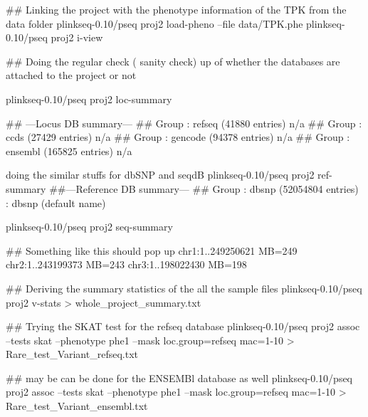## Linking the project with the phenotype information of the TPK from the data folder
plinkseq-0.10/pseq proj2 load-pheno --file data/TPK.phe 
plinkseq-0.10/pseq proj2 i-view


## Doing the regular check ( sanity check) up of whether the databases are attached to the project or not

plinkseq-0.10/pseq proj2 loc-summary

## ---Locus DB summary---
## Group : refseq (41880 entries) n/a
## Group : ccds (27429 entries) n/a
## Group : gencode (94378 entries) n/a
## Group : ensembl (165825 entries) n/a

doing the similar stuffs for dbSNP and seqdB
plinkseq-0.10/pseq proj2 ref-summary 
##---Reference DB summary---
## Group : dbsnp (52054804 entries) : dbsnp (default name)

plinkseq-0.10/pseq proj2 seq-summary 

## Something like this should pop up
chr1:1..249250621	MB=249
chr2:1..243199373	MB=243
chr3:1..198022430	MB=198

## Deriving the summary statistics of the all the sample files
plinkseq-0.10/pseq proj2 v-stats > whole_project_summary.txt

## Trying the SKAT test for the refseq database 
 plinkseq-0.10/pseq proj2 assoc --tests skat --phenotype phe1 --mask loc.group=refseq  mac=1-10 > Rare_test_Variant_refseq.txt

## may be can be done for the ENSEMBl database as well
 plinkseq-0.10/pseq proj2 assoc --tests skat --phenotype phe1 --mask loc.group=refseq  mac=1-10 > Rare_test_Variant_ensembl.txt

 
 

